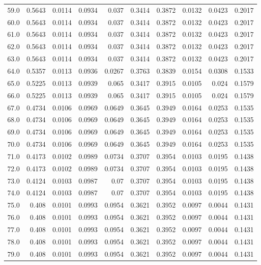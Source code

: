 \begin{longtable}{lrrrrrrrrr}
59.0 & 0.5643 & 0.0114 & 0.0934 & 0.037 & 0.3414 & 0.3872 & 0.0132 & 0.0423 & 0.2017 \\
60.0 & 0.5643 & 0.0114 & 0.0934 & 0.037 & 0.3414 & 0.3872 & 0.0132 & 0.0423 & 0.2017 \\
61.0 & 0.5643 & 0.0114 & 0.0934 & 0.037 & 0.3414 & 0.3872 & 0.0132 & 0.0423 & 0.2017 \\
62.0 & 0.5643 & 0.0114 & 0.0934 & 0.037 & 0.3414 & 0.3872 & 0.0132 & 0.0423 & 0.2017 \\
63.0 & 0.5643 & 0.0114 & 0.0934 & 0.037 & 0.3414 & 0.3872 & 0.0132 & 0.0423 & 0.2017 \\
64.0 & 0.5357 & 0.0113 & 0.0936 & 0.0267 & 0.3763 & 0.3839 & 0.0154 & 0.0308 & 0.1533 \\
65.0 & 0.5225 & 0.0113 & 0.0939 & 0.065 & 0.3417 & 0.3915 & 0.0105 & 0.024 & 0.1579 \\
66.0 & 0.5225 & 0.0113 & 0.0939 & 0.065 & 0.3417 & 0.3915 & 0.0105 & 0.024 & 0.1579 \\
67.0 & 0.4734 & 0.0106 & 0.0969 & 0.0649 & 0.3645 & 0.3949 & 0.0164 & 0.0253 & 0.1535 \\
68.0 & 0.4734 & 0.0106 & 0.0969 & 0.0649 & 0.3645 & 0.3949 & 0.0164 & 0.0253 & 0.1535 \\
69.0 & 0.4734 & 0.0106 & 0.0969 & 0.0649 & 0.3645 & 0.3949 & 0.0164 & 0.0253 & 0.1535 \\
70.0 & 0.4734 & 0.0106 & 0.0969 & 0.0649 & 0.3645 & 0.3949 & 0.0164 & 0.0253 & 0.1535 \\
71.0 & 0.4173 & 0.0102 & 0.0989 & 0.0734 & 0.3707 & 0.3954 & 0.0103 & 0.0195 & 0.1438 \\
72.0 & 0.4173 & 0.0102 & 0.0989 & 0.0734 & 0.3707 & 0.3954 & 0.0103 & 0.0195 & 0.1438 \\
73.0 & 0.4124 & 0.0103 & 0.0987 & 0.07 & 0.3707 & 0.3954 & 0.0103 & 0.0195 & 0.1438 \\
74.0 & 0.4124 & 0.0103 & 0.0987 & 0.07 & 0.3707 & 0.3954 & 0.0103 & 0.0195 & 0.1438 \\
75.0 & 0.408 & 0.0101 & 0.0993 & 0.0954 & 0.3621 & 0.3952 & 0.0097 & 0.0044 & 0.1431 \\
76.0 & 0.408 & 0.0101 & 0.0993 & 0.0954 & 0.3621 & 0.3952 & 0.0097 & 0.0044 & 0.1431 \\
77.0 & 0.408 & 0.0101 & 0.0993 & 0.0954 & 0.3621 & 0.3952 & 0.0097 & 0.0044 & 0.1431 \\
78.0 & 0.408 & 0.0101 & 0.0993 & 0.0954 & 0.3621 & 0.3952 & 0.0097 & 0.0044 & 0.1431 \\
79.0 & 0.408 & 0.0101 & 0.0993 & 0.0954 & 0.3621 & 0.3952 & 0.0097 & 0.0044 & 0.1431 \\

\end{longtable}
